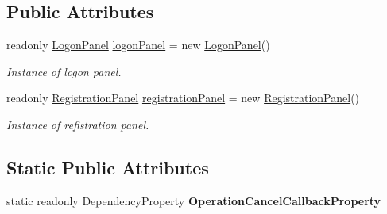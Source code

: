 \subsection*{Public Attributes}
\begin{DoxyCompactItemize}
\item 
readonly \mbox{\hyperlink{class_wpf_handler_1_1_u_i_1_1_controls_1_1_logon_1_1_logon_panel}{Logon\+Panel}} \mbox{\hyperlink{class_wpf_handler_1_1_u_i_1_1_controls_1_1_logon_1_1_logon_screen_a410f16aabbf34281eb778da292be0966}{logon\+Panel}} = new \mbox{\hyperlink{class_wpf_handler_1_1_u_i_1_1_controls_1_1_logon_1_1_logon_panel}{Logon\+Panel}}()
\begin{DoxyCompactList}\small\item\em Instance of logon panel. \end{DoxyCompactList}\item 
readonly \mbox{\hyperlink{class_wpf_handler_1_1_u_i_1_1_controls_1_1_logon_1_1_registration_panel}{Registration\+Panel}} \mbox{\hyperlink{class_wpf_handler_1_1_u_i_1_1_controls_1_1_logon_1_1_logon_screen_a9de43de9ee6526493d97226d75385262}{registration\+Panel}} = new \mbox{\hyperlink{class_wpf_handler_1_1_u_i_1_1_controls_1_1_logon_1_1_registration_panel}{Registration\+Panel}}()
\begin{DoxyCompactList}\small\item\em Instance of refistration panel. \end{DoxyCompactList}\end{DoxyCompactItemize}
\subsection*{Static Public Attributes}
\begin{DoxyCompactItemize}
\item 
static readonly Dependency\+Property {\bfseries Operation\+Cancel\+Callback\+Property}
\end{DoxyCompactItemize}
